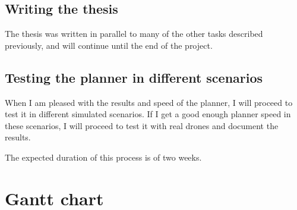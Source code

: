 \subsection{Writing the thesis}
The thesis was written in parallel to many of the other tasks described previously, and will continue until the end of the project.

\subsection{Testing the planner in different scenarios}
When I am pleased with the results and speed of the planner, I will proceed to test it in different simulated scenarios. If I get a good enough planner speed in these scenarios, I will proceed to test it with real drones and document the results.

The expected duration of this process is of two weeks.

\section{Gantt chart}


